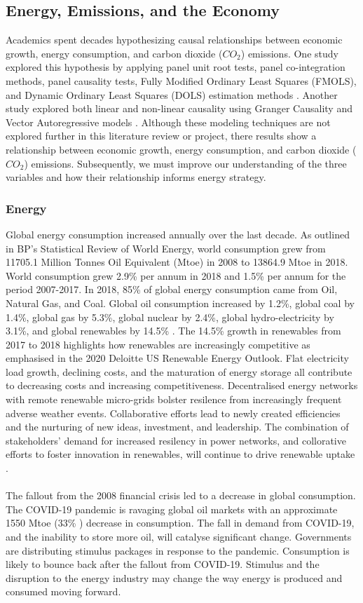 \documentclass[12pt]{article}
\begin{document}
\subsection{Energy, Emissions, and the Economy}
Academics spent decades hypothesizing causal relationships between economic growth, energy consumption, and carbon dioxide ($CO_2$) emissions.
One study explored this hypothesis by applying panel unit root tests, panel co-integration methods, panel causality tests, Fully Modified Ordinary Least Squares (FMOLS), and Dynamic Ordinary Least Squares (DOLS) estimation methods \cite{J:3}.
Another study explored both linear and non-linear causality using Granger Causality and Vector Autoregressive models \cite{J:9}.
Although these modeling techniques are not explored further in this literature review or project, there results show a relationship between economic growth, energy consumption, and carbon dioxide ($CO_2$) emissions.
Subsequently, we must improve our understanding of the three variables and how their relationship informs energy strategy.

\subsubsection{Energy}
Global energy consumption increased annually over the last decade. 
As outlined in BP's Statistical Review of World Energy, world consumption grew from 11705.1 Million Tonnes Oil Equivalent (Mtoe) in 2008 to 13864.9 Mtoe in 2018.
World consumption grew 2.9\% per annum in 2018 and 1.5\% per annum for the period 2007-2017. 
In 2018, 85\% of global energy consumption came from Oil, Natural Gas, and Coal.
Global oil consumption increased by 1.2\%, global coal by 1.4\%, global gas by 5.3\%, global nuclear by 2.4\%, global hydro-electricity by 3.1\%, and global renewables by 14.5\% \cite{TR:3}.
The 14.5\% growth in renewables from 2017 to 2018 highlights how renewables are increasingly competitive as emphasised in the 2020 Deloitte US Renewable Energy Outlook. Flat electricity load growth, declining costs, and the maturation of energy storage
all contribute to decreasing costs and increasing competitiveness. 
Decentralised energy networks with remote renewable micro-grids bolster resilence from increasingly frequent adverse weather events. 
Collaborative efforts lead to newly created efficiencies and the nurturing of new ideas, investment, and leadership. 
The combination of stakeholders' demand for increased resilency in power networks, and collorative efforts to foster innovation in renewables, will continue to drive renewable uptake \cite{TR:4}. \\\\
The fallout from the 2008 financial crisis led to a decrease in global consumption. 
The COVID-19 pandemic is ravaging global oil markets with an approximate 1550 Mtoe (33\% \cite{W:3}) decrease in consumption. 
The fall in demand from COVID-19, and the inability to store more oil, will catalyse significant change. 
Governments are distributing stimulus packages in response to the pandemic. 
Consumption is likely to bounce back after the fallout from COVID-19. 
Stimulus and the disruption to the energy industry may change the way energy is produced and consumed moving forward.
\end{document}
